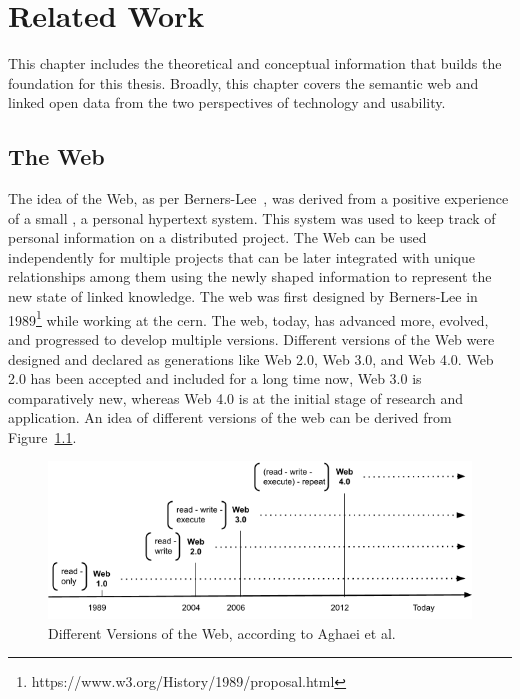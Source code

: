 
\chapter{Related Work}
\label{chap:relwork}
\begin{doublespace}

This chapter includes the theoretical and conceptual information that builds the foundation for this thesis.
Broadly, this chapter covers the semantic web and linked open data from the two perspectives of technology and usability. 



\section{The Web}

The idea of the Web, as per Berners-Lee~\cite{bernersreadings}, was derived from a positive experience of a small , a personal hypertext system. This  system was used to keep track of personal information on a distributed project. The Web can be used independently for multiple projects that can be later integrated with unique relationships among them using the newly shaped information to represent the new state of linked knowledge.
The web was first designed by Berners-Lee in 1989\footnote{https://www.w3.org/History/1989/proposal.html} while working at the \ac{cern}. The web, today, has advanced more, evolved, and progressed to develop multiple versions. Different versions of the Web were designed and declared as generations like Web 2.0, Web 3.0, and Web 4.0. Web 2.0 has been accepted and included for a long time now, Web 3.0 is comparatively new, whereas Web 4.0 is at the initial stage of research and application. An idea of different versions of the web can be derived from Figure~\ref{fig:2.1}.
\begin{figure}[htp]
    \centering
    \includegraphics[width=15cm]{images/ch2/Figure1.png}
    \caption{Different Versions of the Web, according to Aghaei et al.~\cite{aghaei2012evolution}}
    \label{fig:2.1}
\end{figure}


\end{doublespace}
